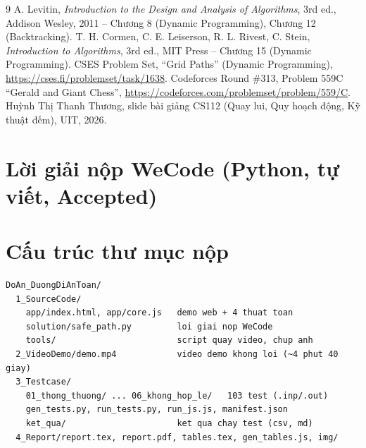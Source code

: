 \documentclass[12pt,a4paper]{report}
\begin{document}
\begin{thebibliography}{9}
 A. Levitin, \emph{Introduction to the Design and Analysis of Algorithms}, 3rd ed., Addison Wesley, 2011 -- Chương 8 (Dynamic Programming), Chương 12 (Backtracking).
 T. H. Cormen, C. E. Leiserson, R. L. Rivest, C. Stein, \emph{Introduction to Algorithms}, 3rd ed., MIT Press -- Chương 15 (Dynamic Programming).
 CSES Problem Set, ``Grid Paths'' (Dynamic Programming), \url{https://cses.fi/problemset/task/1638}.
 Codeforces Round \#313, Problem 559C ``Gerald and Giant Chess'', \url{https://codeforces.com/problemset/problem/559/C}.
 Huỳnh Thị Thanh Thương, slide bài giảng CS112 (Quay lui, Quy hoạch động, Kỹ thuật đếm), UIT, 2026.
\end{thebibliography}

\appendix
\chapter{Lời giải nộp WeCode (Python, tự viết, Accepted)}


\chapter{Cấu trúc thư mục nộp}
\begin{lstlisting}[numbers=none]
DoAn_DuongDiAnToan/
  1_SourceCode/
    app/index.html, app/core.js   demo web + 4 thuat toan
    solution/safe_path.py         loi giai nop WeCode
    tools/                        script quay video, chup anh
  2_VideoDemo/demo.mp4            video demo khong loi (~4 phut 40 giay)
  3_Testcase/
    01_thong_thuong/ ... 06_khong_hop_le/   103 test (.inp/.out)
    gen_tests.py, run_tests.py, run_js.js, manifest.json
    ket_qua/                      ket qua chay test (csv, md)
  4_Report/report.tex, report.pdf, tables.tex, gen_tables.js, img/
\end{lstlisting}
\end{document}
